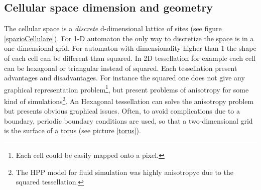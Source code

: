 \subsection{Cellular space dimension and geometry}
The cellular space is a \emph{discrete} d-dimensional lattice of sites (see
figure \ref{spazioCellulare}).
For 1-D automaton the only way to discretize the space is in a one-dimensional
grid. For automaton with dimensionality higher than 1 the shape of each cell can
be different than squared. In 2D tessellation for example each cell can be
hexagonal or triangular instead of squared. Each tessellation present advantages
and disadvantages. For instance the squared one does not give any graphical
representation problem\footnote{Each cell could be easily mapped onto a
pixel.}, but present problems of anisotropy for some kind of
simulations\footnote{The HPP model for fluid simulation was highly anisotropyc due to the squared tessellation.}\cite{Frisch1986}.
An Hexagonal tessellation can solve the anisotropy problem\cite{wolfram1986} but
presents obvious graphical issues. Often, to avoid complications
due to a boundary, periodic boundary conditions are used, so that a two-dimensional grid
is the surface of a torus (see picture \ref{torus}).


